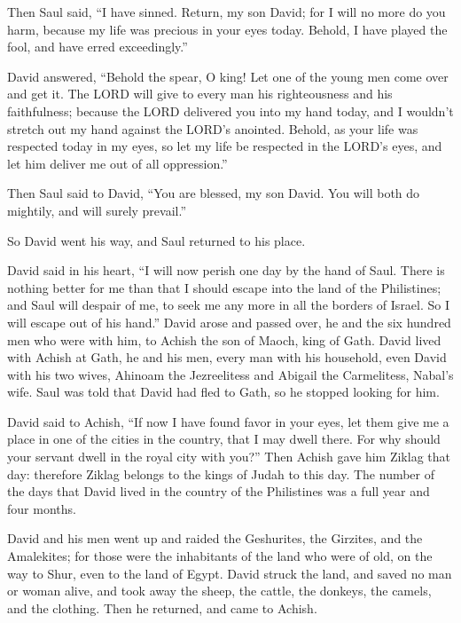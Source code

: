 \myverse{}Then Saul said, “I have sinned. Return, my son David; for I
will no more do you harm, because my life was precious in your eyes today. Behold, I have played the fool,
and have erred exceedingly.”

\myverse{}David answered, “Behold the spear, O king! Let one of the young
men come over and get it.
\myverse{}The LORD will give to every man his righteousness and his faithfulness; because
the LORD delivered you into my hand today, and I wouldn’t stretch out my hand against the LORD’s anointed.
\myverse{}Behold, as your life was respected today in my eyes, so let my life be respected
in the LORD’s eyes, and let him deliver me out of all oppression.”

\myverse{}Then Saul said to David, “You are blessed, my son David. You
will both do mightily, and will surely prevail.”

So David went his way, and Saul returned to his place.


\mychapter{} \myverse*{}David said in his heart, “I will now perish one day by the hand
of Saul. There is nothing better for me than that I should escape into the land of the Philistines; and
Saul will despair of me, to seek me any more in all the borders of Israel. So I will escape out of his
hand.”
\myverse{}David arose and passed over, he and the six hundred men who were with him,
to Achish the son of Maoch, king of Gath.
\myverse{}David lived with Achish at Gath, he and his men, every man with his household,
even David with his two wives, Ahinoam the Jezreelitess and Abigail the Carmelitess, Nabal’s wife.
\myverse{}Saul was told that David had fled to Gath, so he stopped looking for him.

\myverse{}David said to Achish, “If now I have found favor in your eyes,
let them give me a place in one of the cities in the country, that I may dwell there. For why should your
servant dwell in the royal city with you?”
\myverse{}Then Achish gave him Ziklag that day: therefore Ziklag belongs to the kings
of Judah to this day.
\myverse{}The number of the days that David lived in the country of the Philistines was
a full year and four months.

\myverse{}David and his men went up and raided the Geshurites, the Girzites,
and the Amalekites; for those were the inhabitants of the land who were of old, on the way to Shur, even
to the land of Egypt.
\myverse{}David struck the land, and saved no man or woman alive, and took away the sheep,
the cattle, the donkeys, the camels, and the clothing. Then he returned, and came to Achish.

